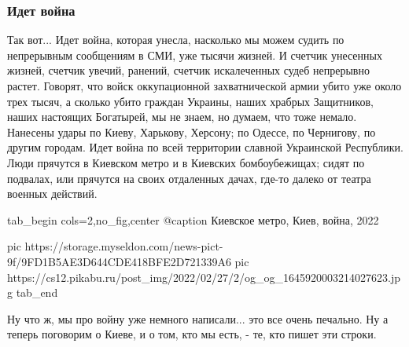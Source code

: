  
 
 
 
 

\subsubsection{Идет война}

Так вот... Идет война, которая унесла, насколько мы можем судить по непрерывным
сообщениям в СМИ, уже тысячи жизней. И счетчик унесенных жизней, счетчик
увечий, ранений, счетчик искалеченных судеб непрерывно растет. Говорят, что
войск оккупационной захватнической армии убито уже около трех тысяч, а сколько
убито граждан Украины, наших храбрых Защитников, наших настоящих Богатырей, мы
не знаем, но думаем, что тоже немало. Нанесены удары по Киеву, Харькову,
Херсону; по Одессе, по Чернигову, по другим городам. Идет война по всей
территории славной Украинской Республики. Люди прячутся в Киевском метро и в Киевских 
бомбоубежищах; сидят по подвалах, или прячутся на своих отдаленных дачах, где-то далеко от театра
военных действий. 

\ifcmt
  tab_begin cols=2,no_fig,center
		 @caption Киевское метро, Киев, война, 2022

		 pic https://storage.myseldon.com/news-pict-9f/9FD1B5AE3D644CDE418BFE2D721339A6
     pic https://cs12.pikabu.ru/post_img/2022/02/27/2/og_og_1645920003214027623.jpg
  tab_end
\fi

Ну что ж, мы про войну уже немного написали... это все очень печально. Ну а
теперь поговорим о Киеве, и о том, кто мы есть, - те, кто пишет эти строки.

